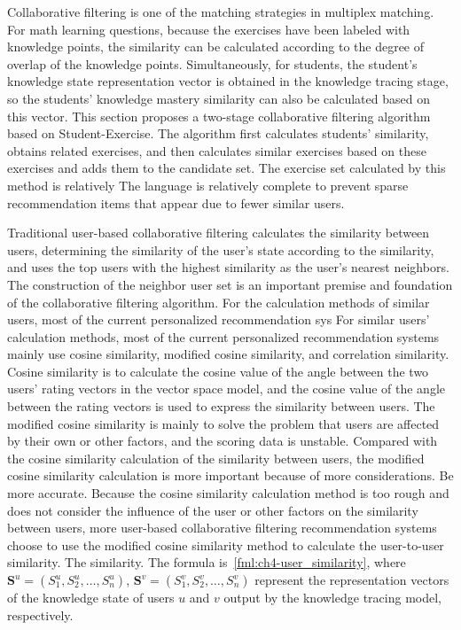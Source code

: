Collaborative filtering is one of the matching strategies in multiplex matching. For math learning questions, because the exercises have been labeled with knowledge points, the similarity can be calculated according to the degree of overlap of the knowledge points. Simultaneously, for students, the student's knowledge state representation vector is obtained in the knowledge tracing stage, so the students' knowledge mastery similarity can also be calculated based on this vector. This section proposes a two-stage collaborative filtering algorithm based on Student-Exercise. The algorithm first calculates students' similarity, obtains related exercises, and then calculates similar exercises based on these exercises and adds them to the candidate set. The exercise set calculated by this method is relatively The language is relatively complete to prevent sparse recommendation items that appear due to fewer similar users.

Traditional user-based collaborative filtering calculates the similarity between users, determining the similarity of the user's state according to the similarity, and uses the top users with the highest similarity as the user's nearest neighbors. The construction of the neighbor user set is an important premise and foundation of the collaborative filtering algorithm. For the calculation methods of similar users, most of the current personalized recommendation sys For similar users' calculation methods, most of the current personalized recommendation systems mainly use cosine similarity, modified cosine similarity, and correlation similarity. Cosine similarity is to calculate the cosine value of the angle between the two users' rating vectors in the vector space model, and the cosine value of the angle between the rating vectors is used to express the similarity between users. The modified cosine similarity is mainly to solve the problem that users are affected by their own or other factors, and the scoring data is unstable. Compared with the cosine similarity calculation of the similarity between users, the modified cosine similarity calculation is more important because of more considerations. Be more accurate. Because the cosine similarity calculation method is too rough and does not consider the influence of the user or other factors on the similarity between users, more user-based collaborative filtering recommendation systems choose to use the modified cosine similarity method to calculate the user-to-user similarity. The similarity. The formula is~\ref{fml:ch4-user_similarity}, where \(\mathbf{S}^u=(S^u_1,S^u_2,\ldots,S^u_n)\), \(\mathbf{S}^v=(S^v_1,S^v_2,\ldots, S^v_n)\) represent the representation vectors of the knowledge state of users \(u\) and \(v\) output by the knowledge tracing model, respectively.

